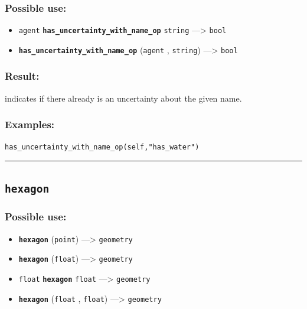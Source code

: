 \documentclass[]{book}
\providecommand{\tightlist}{%
  \setlength{\itemsep}{0pt}\setlength{\parskip}{0pt}}
\theoremstyle{definition}
\theoremstyle{definition}
\theoremstyle{definition}
\theoremstyle{remark}
\begin{document}
\subsubsection{Possible use:}\label{possible-use-257}

\begin{itemize}
\tightlist
\item
  \texttt{agent} \textbf{\texttt{has\_uncertainty\_with\_name\_op}}
  \texttt{string} ---\textgreater{} \texttt{bool}
\item
  \textbf{\texttt{has\_uncertainty\_with\_name\_op}} (\texttt{agent} ,
  \texttt{string}) ---\textgreater{} \texttt{bool}
\end{itemize}

\subsubsection{Result:}\label{result-248}

indicates if there already is an uncertainty about the given name.

\subsubsection{Examples:}\label{examples-197}

\begin{verbatim}
has_uncertainty_with_name_op(self,"has_water") 
\end{verbatim}

\begin{center}\rule{0.5\linewidth}{\linethickness}\end{center}

\subsection{\texorpdfstring{\texttt{hexagon}}{hexagon}}\label{hexagon}

\subsubsection{Possible use:}\label{possible-use-258}

\begin{itemize}
\tightlist
\item
  \textbf{\texttt{hexagon}} (\texttt{point}) ---\textgreater{}
  \texttt{geometry}
\item
  \textbf{\texttt{hexagon}} (\texttt{float}) ---\textgreater{}
  \texttt{geometry}
\item
  \texttt{float} \textbf{\texttt{hexagon}} \texttt{float}
  ---\textgreater{} \texttt{geometry}
\item
  \textbf{\texttt{hexagon}} (\texttt{float} , \texttt{float})
  ---\textgreater{} \texttt{geometry}
\end{itemize}
\end{document}
